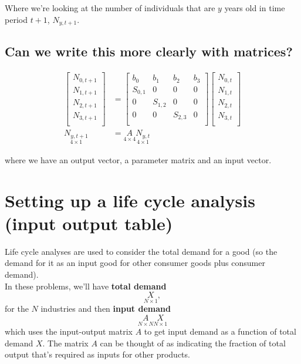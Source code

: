 \documentclass{article}
\begin{document}
Where we're looking at the number of individuals that are $y$ years old in time period $t+1$, $N_{y, t+1}$.\\

\subsection{Can we write this more clearly with matrices?}

\begin{align}
    \begin{bmatrix}
        N_{0, t+1}\\
        N_{1, t+1} \\
        N_{2, t+1} \\
        N_{3, t+1}\\
    \end{bmatrix} &= 
    \begin{bmatrix}
        b_0 & b_1 & b_2 & b_3\\
        S_{0,1} & 0 & 0 &0 \\
        0 & S_{1,2} & 0 &0 \\
        0 & 0 & S_{2,3} &0 \\
    \end{bmatrix}
    \begin{bmatrix}
        N_{0, t}\\
        N_{1, t} \\
        N_{2, t} \\
        N_{3, t}\\
    \end{bmatrix} \\
    \underset{4 \times 1}{N_{y, t+1}} &= \underset{4 \times 4}{A} \underset{4 \times 1}{N_{y,t}}
\end{align}

where we have an output vector, a parameter matrix and an input vector. 

\section{Setting up a life cycle analysis (input output table)} 
Life cycle analyses are used to consider the total demand for a good (so the demand for it as an input good for other consumer goods plus consumer demand). \\

In these problems, we'll have \textbf{total demand} 
\[\underset{N \times 1}{X},\] 
for the $N$ industries and then \textbf{input demand} 
\[\underset{N \times N}{A} \underset{N \times 1 }{X}\] 
which uses the input-output matrix $A$ to get input demand as a function of total demand $X$. The matrix $A$ can be thought of as indicating the fraction of total output that's required as inputs for other products.\\
\end{document}

